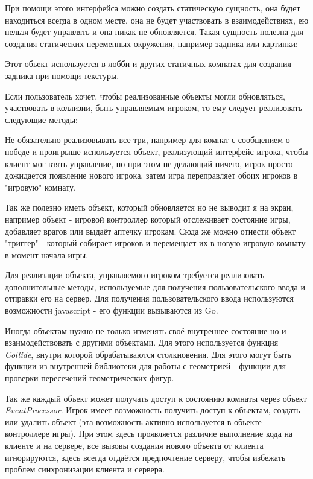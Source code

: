 \documentclass[a4paper,14pt, openany]{book}
\begin{document}
При помощи этого интерфейса можно создать статическую сущность, она будет находиться всегда в одном месте, она не будет участвовать в взаимодействиях, ею нельзя будет управлять и она никак не обновляется. Такая сущность полезна для создания статических переменных окружения, например задника или картинки:


Этот обьект используется в лобби и других статичных комнатах для создания задника при помощи текстуры.

Если пользователь хочет, чтобы реализованные объекты могли обновляться, участвовать в коллизии, быть управляемым игроком, то ему следует реализовать следующие методы:


Не обязательно реализовывать все три, например для комнат с сообщением о победе и проигрыше используется объект, реализующий интерфейс игрока, чтобы клиент мог взять управление, но при этом не делающий ничего, игрок просто дожидается появление нового игрока, затем игра переправляет обоих игроков в "игровую" комнату.

Так же полезно иметь объект, который обновляется но не выводит я на экран, например объект - игровой контроллер который отслеживает состояние игры, добавляет врагов или выдаёт аптечку игрокам. Сюда же можно отнести объект "триггер" - который собирает игроков и перемещает их в новую игровую комнату в момент начала игры.

Для реализации объекта, управляемого игроком требуется реализовать дополнительные методы, используемые для получения пользовательского ввода и отправки его на сервер. Для получения пользовательского ввода используются возможности javascript - его функции вызываются из Go. 

Иногда объектам нужно не только изменять своё внутреннее состояние но и взаимодействовать с другими объектами. Для этого используется функция  \textit{Collide}, внутри которой обрабатываются столкновения. Для этого могут быть функции из внутренней библиотеки для работы с геометрией - функции для проверки пересечений геометрических фигур.

Так же каждый объект может получать доступ к состоянию комнаты через объект  \textit{EventProcessor}. Игрок имеет возможность получить доступ к объектам, создать или удалить объект (эта возможность активно используется в обьекте - контроллере игры). При этом здесь проявляется различие выполнение кода на клиенте и на сервере, все вызовы создания нового объекта от клиента игнорируются, здесь всегда отдаётся предпочтение серверу, чтобы избежать проблем синхронизации клиента и сервера. 
\end{document}
